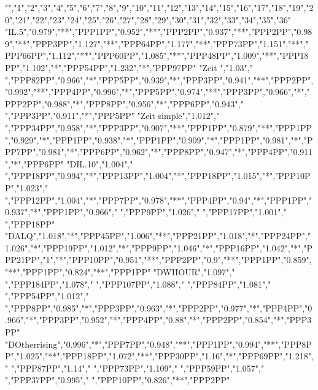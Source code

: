 "","1","2","3","4","5","6","7","8","9","10","11","12","13","14","15","16","17","18","19","20","21","22","23","24","25","26","27","28","29","30","31","32","33","34","35","36"
"IL.5","0.979","**","PPP1PP","0.952","**","PPP2PP","0.937","**","PPP2PP","0.989","**","PPP3PP","1.127","**","PPP64PP","1.177","**","PPP73PP","1.151","**","PPP66PP","1.112","**","PPP60PP","1.085","**","PPP48PP","1.009","**","PPP18PP","1.102","*","PPP54PP","1.232","*","PPP97PP"
"Zeit ","1.03"," ","PPP82PP","0.966","*","PPP5PP","0.939","*","PPP3PP","0.941","**","PPP2PP","0.992","**","PPP4PP","0.996","*","PPP5PP","0.974","**","PPP3PP","0.966","*","PPP2PP","0.988","*","PPP8PP","0.956","*","PPP6PP","0.943"," ","PPP3PP","0.911","*","PPP5PP"
"Zeit simple","1.012"," ","PPP34PP","0.958","*","PPP3PP","0.907","**","PPP1PP","0.879","**","PPP1PP","0.929","*","PPP1PP","0.938","*","PPP1PP","0.909","*","PPP1PP","0.981","*","PPP7PP","0.981","*","PPP6PP","0.962","*","PPP8PP","0.947","*","PPP4PP","0.911","*","PPP6PP"
"DIL.10","1.004"," ","PPP18PP","0.994","*","PPP13PP","1.004","*","PPP18PP","1.015","*","PPP10PP","1.023"," ","PPP12PP","1.004","*","PPP7PP","0.978","**","PPP4PP","0.94","*","PPP1PP","0.937","*","PPP1PP","0.966"," ","PPP9PP","1.026"," ","PPP17PP","1.001"," ","PPP18PP"
"DALQ","1.018","*","PPP45PP","1.006","**","PPP21PP","1.018","*","PPP24PP","1.026","*","PPP19PP","1.012","*","PPP9PP","1.046","*","PPP16PP","1.042","*","PPP21PP","1","*","PPP10PP","0.951","**","PPP2PP","0.9","**","PPP1PP","0.859","**","PPP1PP","0.824","**","PPP1PP"
"DWHOUR","1.097"," ","PPP184PP","1.078"," ","PPP107PP","1.088"," ","PPP84PP","1.081"," ","PPP54PP","1.012"," ","PPP8PP","0.985","*","PPP3PP","0.963","*","PPP2PP","0.977","*","PPP4PP","0.966","*","PPP3PP","0.952","*","PPP4PP","0.88","*","PPP2PP","0.854","*","PPP3PP"
"DOtherrising","0.996","*","PPP7PP","0.948","**","PPP1PP","0.994","**","PPP8PP","1.025","**","PPP18PP","1.072","**","PPP30PP","1.16","*","PPP69PP","1.218"," ","PPP87PP","1.14"," ","PPP73PP","1.109"," ","PPP59PP","1.057"," ","PPP37PP","0.995"," ","PPP10PP","0.826","**","PPP2PP"
